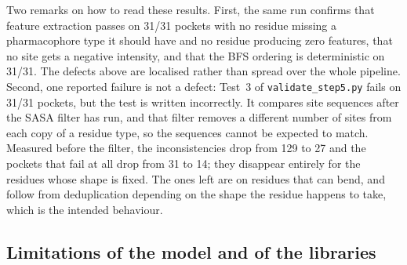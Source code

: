 Two remarks on how to read these results. First, the same run confirms that feature
extraction passes on 31/31 pockets with no residue missing a pharmacophore type it should
have and no residue producing zero features, that no site gets a negative intensity, and
that the BFS ordering is deterministic on 31/31. The defects above are localised rather
than spread over the whole pipeline. Second, one reported failure is not a defect: Test~3
of \texttt{validate\_step5.py} fails on 31/31 pockets, but the test is written
incorrectly. It compares site sequences after the SASA filter has run, and that filter
removes a different number of sites from each copy of a residue type, so the sequences
cannot be expected to match. Measured before the filter, the inconsistencies drop from
129 to 27 and the pockets that fail at all drop from 31 to 14; they disappear entirely
for the residues whose shape is fixed. The ones left are on
residues that can bend, and follow from deduplication depending on the shape the residue
happens to take, which is the intended behaviour.

\subsection*{Limitations of the model and of the libraries}

